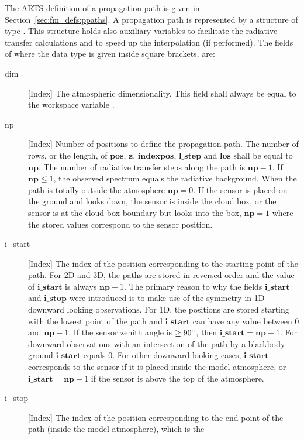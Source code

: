 The ARTS definition of a propagation path is given in
Section~\ref{sec:fm_defs:ppaths}.  A propagation path is represented
by a structure of type . This structure holds also
auxiliary variables to facilitate the radiative transfer calculations
and to speed up the interpolation (if performed). The fields of
 where the data type is given inside square brackets,
are:
\begin{description}
  \item[dim] [Index] The atmospheric dimensionality. This field shall always 
     be equal to the workspace variable .
  \item[np] [Index] Number of positions to define the propagation path. The 
     number of rows, or the length, of $\mathbf{pos}$, $\mathbf{z}$, 
     $\mathbf{indexpos}$, $\mathbf{l\_step}$ and $\mathbf{los}$ shall be
     equal to $\mathbf{np}$. The number of radiative transfer steps along the 
     path is $\mathbf{np}-1$. If $\mathbf{np}\leq 1$, the observed spectrum 
     equals the radiative background. When the path is totally outside the 
     atmosphere $\mathbf{np}=0$. If the sensor is placed on the ground and 
     looks down, the sensor is inside the cloud box, or the sensor is at the 
     cloud box boundary but looks into the box, $\mathbf{np}=1$ where the 
     stored values correspond to the sensor position.
  \item[i\_start] [Index] The index of the position corresponding to the 
     starting point of the path. For 2D and 3D, the paths are stored in
     reversed order and the value of $\mathbf{i\_start}$ is always 
     $\mathbf{np}-1$. The primary reason to why the fields $\mathbf{i\_start}$
     and $\mathbf{i\_stop}$ were introduced is to make use of the symmetry
     in 1D downward looking observations. For 1D, the positions are stored 
     starting with the lowest point of the path and $\mathbf{i\_start}$ can
     have any value between 0 and $\mathbf{np}-1$. If the sensor zenith angle
     is $\geq 90^\circ$, then $\mathbf{i\_start} = \mathbf{np}-1$. For
     downward observations with an intersection of the path by a blackbody 
     ground $\mathbf{i\_start}$ equals 0. For other downward looking cases,
     $\mathbf{i\_start}$ corresponds to the sensor if it is placed inside
     the model atmosphere, or $\mathbf{i\_start} = \mathbf{np}-1$ if the
     sensor is above the top of the atmosphere.
  \item[i\_stop] [Index] The index of the position corresponding to the 
     end point of the path (inside the model atmosphere), which is the 

\end{description}
